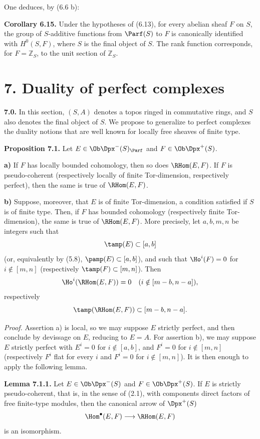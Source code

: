 One deduces, by (6.6 b):

\textbf{Corollary 6.15.} Under the hypotheses of (6.13), for every abelian sheaf \(F\) on \(S\), the group of \(S\)-additive functions from \(\Parf(S)\) to \(F\) is canonically identified with \(H^0(S,F)\), where \(S\) is the final object of \(S\). The rank function corresponds, for \(F=\mathbb Z_S\), to the unit section of \(\mathbb Z_S\).

\section*{7. Duality of perfect complexes}

\textbf{7.0.} In this section, \((S,A)\) denotes a topos ringed in commutative rings, and \(S\) also denotes the final object of \(S\). We propose to generalize to perfect complexes the duality notions that are well known for locally free sheaves of finite type.

\textbf{Proposition 7.1.} Let \(E\in\Ob\Dpx^-(S)_{\Parf}\) and \(F\in\Ob\Dpx^+(S)\).

\textbf{a)} If \(F\) has locally bounded cohomology, then so does \(\RHom(E,F)\). If \(F\) is pseudo-coherent (respectively locally of finite Tor-dimension, respectively perfect), then the same is true of \(\RHom(E,F)\).

\textbf{b)} Suppose, moreover, that \(E\) is of finite Tor-dimension, a condition satisfied if \(S\) is of finite type. Then, if \(F\) has bounded cohomology (respectively finite Tor-dimension), the same is true of \(\RHom(E,F)\). More precisely, let \(a,b,m,n\) be integers such that
\[
  \tamp(E)\subset[a,b]
\]
(or, equivalently by (5.8), \(\pamp(E)\subset[a,b]\)), and such that \(\Ho^i(F)=0\) for \(i\notin[m,n]\) (respectively \(\tamp(F)\subset[m,n]\)). Then
\[
  \Ho^i(\RHom(E,F))=0\quad(i\notin[m-b,n-a]),
\]
respectively
\[
  \tamp(\RHom(E,F))\subset[m-b,n-a].
\]

\emph{Proof.} Assertion a) is local, so we may suppose \(E\) strictly perfect, and then conclude by devissage on \(E\), reducing to \(E=A\). For assertion b), we may suppose \(E\) strictly perfect with \(E^i=0\) for \(i\notin[a,b]\), and \(F^i=0\) for \(i\notin[m,n]\) (respectively \(F^i\) flat for every \(i\) and \(F^i=0\) for \(i\notin[m,n]\)). It is then enough to apply the following lemma.

\textbf{Lemma 7.1.1.} Let \(E\in\Ob\Dpx^-(S)\) and \(F\in\Ob\Dpx^+(S)\). If \(E\) is strictly pseudo-coherent, that is, in the sense of (2.1), with components direct factors of free finite-type modules, then the canonical arrow of \(\Dpx^+(S)\)
\[
  \Hom^\bullet(E,F)\longrightarrow \RHom(E,F)
\]
is an isomorphism.

